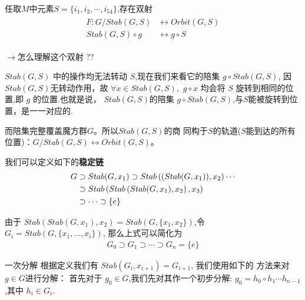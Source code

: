 \documentclass{beamer}
\newcommand{\lr}{\ensuremath{\longrightarrow}}
\begin{document}
\begin{frame}
    任取$M$中元素$S = \{i_1, i_2,\cdots,i_{54}\}$,存在双射
\begin{align}
    \begin{aligned}
        F:G\bigg/Stab(G, S) &\longleftrightarrow Orbit(G,S)\\
        Stab(G, S)\circ g & \longleftrightarrow g\circ S
    \end{aligned}
\end{align}

\end{frame} 

\begin{frame}
\lr 怎么理解这个双射\; ?? 

{   
    \kaishu
    $Stab(G,S)$ 中的操作均无法转动 $S$,现在我们来看它的陪集
    $g\circ Stab(G,S)$, 因$Stab(G,S)$无转动作用，故 $\forall x\in Stab(G,S),$
    $g\circ x$ 均会将 $S$ 旋转到相同的位置,即 $g$ 的位置.也就是说，
    $Stab(G,S)$的陪集 $g\circ Stab(G,S)$,与$S$能被旋转到位置，是一一对应的.

    而陪集完整覆盖魔方群$G$。所以$Stab(G,S)$的商
    同构于$S$的轨道($S$能到达的所有位置)：$G/Stab(G,S) \longleftrightarrow Orbit(G,S)$。
}
\end{frame} 

\begin{frame}
    我们可以定义如下的{\bf 稳定链}
\begin{align}
	G & \supset Stab(G,x_1) \supset Stab\left((Stab(G,x_1)), x_2\right) \cdots \notag\\
	  & \supset Stab\left(Stab\left(Stab(G, x_1),x_2\right),x_3\right)\notag \\
	  & \supset \cdots \supset \{e\}	
\end{align}

由于 $Stab(Stab(G, x_1), x_2) = Stab(G, \{x_1, x_2\})$,令$G_i = Stab(G,\{x_1,\ldots,x_i\})$,
那么上式可以简化为
\begin{align}
	G_0 \supset G_1 \supset \cdots \supset G_n=\{e\}
\end{align}
\end{frame} 

\begin{frame}{一次分解}
    根据定义我们有 $Stab(G_i, x_{i+1}) = G_{i+1}$, 我们使用如下的
方法来对 $g\in G$进行分解：
首先对于 $g_0 \in G$,我们先对其作一个初步分解: $g_0 = h_0\circ h_1\cdots h_{n-1}$,其中
$h_i \in G_i$.
\end{frame} 
\end{document}
